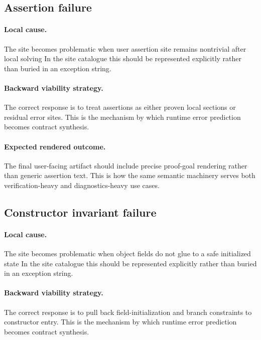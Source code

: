 \documentclass[11pt]{report}
\theoremstyle{definition}
\theoremstyle{plain}
\begin{document}
\subsection{Assertion failure}

\paragraph{Local cause.}
The site becomes problematic when user assertion site remains nontrivial after local solving In the site catalogue this should be
represented explicitly rather than buried in an exception string.

\paragraph{Backward viability strategy.}
The correct response is to treat assertions as either proven local sections or residual error sites. This is the mechanism by which runtime
error prediction becomes contract synthesis.

\paragraph{Expected rendered outcome.}
The final user-facing artifact should include precise proof-goal rendering rather than generic assertion text. This is how the same
semantic machinery serves both verification-heavy and diagnostics-heavy use
cases.

\subsection{Constructor invariant failure}

\paragraph{Local cause.}
The site becomes problematic when object fields do not glue to a safe initialized state In the site catalogue this should be
represented explicitly rather than buried in an exception string.

\paragraph{Backward viability strategy.}
The correct response is to pull back field-initialization and branch constraints to constructor entry. This is the mechanism by which runtime
error prediction becomes contract synthesis.
\end{document}
